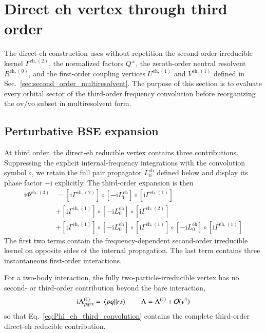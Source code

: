 \documentclass[aip,jcp,reprint,noshowkeys,superscriptaddress]{revtex4-1}
\newcommand{\ii}{\mathrm{i}}
\newcommand{\eh}{\text{eh}}
\begin{document}
\appendix

\section{Direct eh vertex through third order}
\label{sec:eh_third}

The direct-$\eh$ construction uses without repetition the second-order
irreducible kernel $\Gamma^{\eh,(2)}$, the normalized factors $Q^\pm$,
the zeroth-order neutral resolvent $R^{\eh,(0)}$, and the first-order
coupling vertices $U^{\eh,(1)}$ and $V^{\eh,(1)}$ defined in Sec.~\ref{sec:second_order_multiresolvent}.
The purpose of this section is to evaluate every orbital sector of the
third-order frequency convolution before reorganizing the $\text{ov}/\text{vo}$ subset in
multiresolvent form.

\subsection{Perturbative BSE expansion}

At third order, the direct-$\eh$ reducible vertex contains three
contributions.
Suppressing the explicit internal-frequency integrations with the convolution
symbol $\circ$, we retain the full pair propagator $L_0^\eh$ defined below
and display its phase factor $-\ii$ explicitly.
The third-order expansion is then
\begin{equation}
    \begin{split}
    \ii\Phi^{\eh,(3)}
    & =
    \left[\ii\Gamma^{\eh,(2)}\right]
    \circ\left[-\ii L_0^\eh\right]
    \circ\left[\ii\Gamma^{\eh,(1)}\right]
    \\
    &+
    \left[\ii\Gamma^{\eh,(1)}\right]
    \circ\left[-\ii L_0^\eh\right]
    \circ\left[\ii\Gamma^{\eh,(2)}\right]
    \\
    &+
    \left[\ii\Gamma^{\eh,(1)}\right]
    \circ\left[-\ii L_0^\eh\right]
    \circ\left[\ii\Gamma^{\eh,(1)}\right]
    \circ\left[-\ii L_0^\eh\right]
    \circ\left[\ii\Gamma^{\eh,(1)}\right]
    \end{split}
    \label{eq:Phi_eh_third_convolution}
\end{equation}
The first two terms contain the frequency-dependent second-order irreducible
kernel on opposite sides of the internal propagation.
The last term contains three instantaneous first-order interactions.

For a two-body interaction, the fully two-particle-irreducible vertex has no
second- or third-order contribution beyond the bare interaction,
\begin{equation}
    \ii\Lambda^{(1)}_{pqrs}
    =
    \mel{pq}{}{rs}
    \qquad
    \Lambda
    =
    \Lambda^{(1)}+\mathcal O(v^4)
    \label{eq:Lambda_through_third}
\end{equation}
so that Eq.~\eqref{eq:Phi_eh_third_convolution} contains the complete
third-order direct-$\eh$ reducible contribution.
\end{document}
